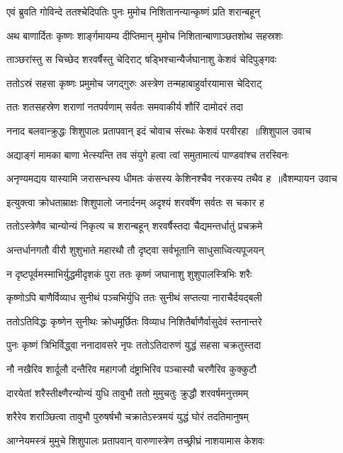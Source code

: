 \twolineshloka
{एवं ब्रुवति गोविन्दे ततश्चेदिपतिः पुनः}
{मुमोच निशितानन्यान्कृष्णं प्रति शरान्बहून्}


\twolineshloka
{अथ बाणार्दितः कृष्णः शार्ङ्गमायम्य दीप्तिमान्}
{मुमोच निशितान्बाणाञ्छतशोथ सहस्रशः}


\twolineshloka
{ताञ्छरांस्तु स चिच्छेद शरवर्षैस्तु चेदिराट्}
{षड्भिश्चान्यैर्जघानाशु केशवं चेदिपुङ्गवः}


\twolineshloka
{ततोऽस्रं सहसा कृष्णः प्रमुमोच जगद्गुरुः}
{अस्त्रेण तन्महाबाहुर्वारयामास चेदिराट्}


\twolineshloka
{ततः शतसहस्रेण शराणां नतपर्वणाम्}
{सर्वतः समवाकीर्य शौरिं दामोदरं तदा}


\twolineshloka
{ननाद बलवान्क्रुद्धः शिशुपालः प्रतापवान्}
{इदं चोवाच संरब्धः केशवं परवीरहा ॥शिशुपाल उवाच}


\twolineshloka
{अद्याङ्गं मामका बाणा भेत्स्यन्ति तव संयुगे}
{हत्वा त्वां समुतामात्यं पाण्डवांश्च तरस्विनः}


\twolineshloka
{अनृण्यमद्यय यास्यामि जरासन्धस्य धीमतः}
{कंसस्य केशिनश्चैव नरकस्य तथैव ह ॥वैशम्पायन उवाच}


\twolineshloka
{इत्युक्त्वा क्रोधताम्राक्षः शिशुपालो जनार्दनम्}
{अदृश्यं शरवर्षेण सर्वतः स चकार ह}


\twolineshloka
{ततोऽस्त्रेणैव चान्योन्यं निकृत्य च शरान्बहून्}
{शरवर्षैस्तदा चैद्यमन्तर्धातुं प्रचक्रमे}


\twolineshloka
{अन्तर्धानगतौ वीरौ शुशुभाते महारथौ}
{तौ दृष्ट्वा सर्वभूतानि साधुसाध्वित्यपूजयन्}


\twolineshloka
{न दृष्टपूर्वमस्माभिर्युद्धमीदृशकं पुरा}
{ततः कृष्णं जघानाशु शुशुपालस्त्रिभिः शरैः}


\threelineshloka
{कृष्णोऽपि बाणैर्विव्याध सुनीथं पञ्चभिर्युधि}
{ततः सुनीथं सप्तत्या नाराचैर्दयद्बली}
{}


\twolineshloka
{ततोऽतिविद्धः कृष्णेन सुनीथः क्रोधमूर्छितः}
{विव्याध निशितैर्बाणैर्वासुदेवं स्तनान्तरे}


\twolineshloka
{पुनः कृष्णं त्रिभिर्विद्ध्वा ननादावसरे नृपः}
{ततोऽतिदारुणं युद्धं सहसा चक्रतुस्तदा}


\twolineshloka
{नौ नखैरिव शार्दूलौ दन्तैरिव महागजौ}
{दंष्ट्राभिरिव पञ्चास्यौ चरणैरिव कुक्कुटौ}


\twolineshloka
{दारयेतां शरैस्तीक्ष्णैरन्योन्यं युधि तावुभौ}
{ततो मुमुचतुः क्रुद्धौ शरवर्षमनुत्तमम्}


\twolineshloka
{शरैरेव शराञ्छित्वा तावुभौ पुरुषर्षभौ}
{चक्रातेऽस्त्रमयं युद्धं घोरं तदतिमानुषम्}


\twolineshloka
{आग्नेयमस्त्रं मुमुचे शिशुपालः प्रतापवान्}
{वारुणास्त्रेण तच्छ्रीघ्रं नाशयामास केशवः}


